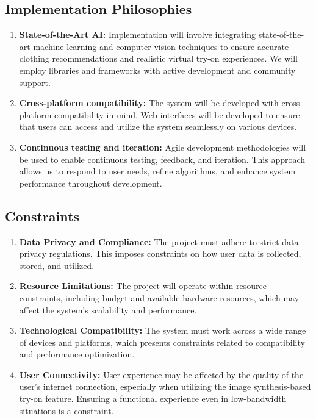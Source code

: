 	\subsection{Implementation Philosophies}
		\begin{enumerate}
			\item \textbf{State-of-the-Art AI:} Implementation will involve integrating state-of-the-art machine learning and computer vision techniques to ensure accurate clothing recommendations and realistic virtual try-on experiences. We will employ libraries and frameworks with active development and community support.
			\item \textbf{Cross-platform compatibility:} The system will be developed with cross platform compatibility in mind. Web interfaces will be developed to ensure that users can access and utilize the system seamlessly on various devices.
			\item \textbf{Continuous testing and iteration:} Agile development methodologies will be used to enable continuous testing, feedback, and iteration. This approach allows us to respond to user needs, refine algorithms, and enhance system performance throughout development.
		\end{enumerate}

	\subsection{Constraints}
		\begin{enumerate}
			\item \textbf{Data Privacy and Compliance:} The project must adhere to strict data privacy regulations. This imposes constraints on how user data is collected, stored, and utilized.
			\item \textbf{Resource Limitations:} The project will operate within resource constraints, including budget and available hardware resources, which may affect the system's scalability and performance.
			\item \textbf{Technological Compatibility:} The system must work across a wide range of devices and platforms, which presents constraints related to compatibility and performance optimization.
			\item \textbf{User Connectivity:} User experience may be affected by the quality of the user's internet connection, especially when utilizing the image synthesis-based try-on feature. Ensuring a functional experience even in low-bandwidth situations is a constraint.
		\end{enumerate}

